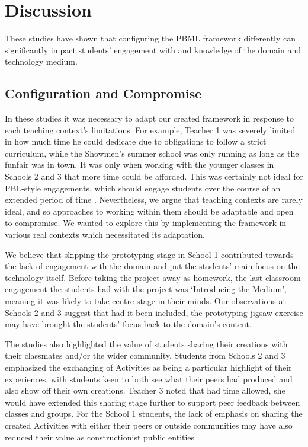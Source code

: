 \documentclass[,hyphens]{sigchi}
\begin{document}
\section{Discussion}
These studies have shown that configuring the PBML framework differently can significantly impact students' engagement with and knowledge of the domain and technology medium.

\subsection{Configuration and Compromise}
In these studies it was necessary to adapt our created framework in response to each teaching context's limitations. For example, Teacher 1 was severely limited in how much time he could dedicate due to obligations to follow a strict curriculum, while the Showmen's summer school was only running as long as the funfair was in town. It was only when working with the younger classes in Schools 2 and 3 that more time could be afforded. This was certainly not ideal for PBL-style engagements, which should engage students over the course of an extended period of time \cite{Blumenfeld1991}. Nevertheless, we argue that teaching contexts are rarely ideal, and so approaches to working within them should be adaptable and open to compromise. We wanted to explore this by implementing the framework in various real contexts which necessitated its adaptation.

We believe that skipping the prototyping stage in School 1 contributed towards the lack of engagement with the domain and put the students' main focus on the technology itself. Before taking the project away as homework, the last classroom engagement the students had with the project was `Introducing the Medium', meaning it was likely to take centre-stage in their minds. Our observations at Schools 2 and 3 suggest that had it been included, the prototyping jigsaw exercise may have brought the students' focus back to the domain's content.

The studies also highlighted the value of students sharing their creations with their classmates and/or the wider community. Students from Schools 2 and 3 emphasized the exchanging of Activities as being a particular highlight of their experiences, with students keen to both see what their peers had produced and also show off their own creations. Teacher 3 noted that had time allowed, she would have extended this sharing stage further to support peer feedback between classes and groups. For the School 1 students, the lack of emphasis on sharing the created Activities with either their peers or outside communities may have also reduced their value as constructionist public entities \cite{PapertSeymourandHarel1991a}.
\end{document}
